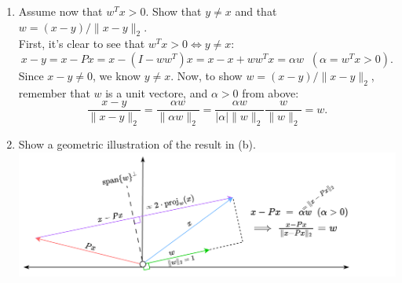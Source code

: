 \documentclass[11pt]{article}
\newcommand{\n}{\vspace{0.3cm}}
\begin{document}
\begin{enumerate}
\begin{enumerate}
		      \item Assume now that \(w^T x > 0\).  Show that \(y \neq x\) and that \(w = (x-y)/\lVert x-y \rVert_2\). \n\\
		            First, it's clear to see that \(w^T x > 0 \iff y \neq x\):
		            \[x - y = x - Px = x - (I - ww^T)x = x - x + ww^T x = \alpha w \;\; (\alpha = w^T x > 0).\]
		            Since \(x - y \neq 0\), we know \(y \neq x\).  Now, to show \(w = (x-y)/\lVert x-y \rVert_2\), remember that \(w\) is a unit vectore, and \(\alpha > 0\) from above:
		            \[\frac{x-y}{\lVert x-y \rVert_2} = \frac{\alpha w}{\lVert \alpha w \rVert_2} = \frac{\alpha w}{|\alpha| \lVert w \rVert_2} \frac{w}{\lVert w \rVert_2} = w.\]

		      \item Show a geometric illustration of the result in (b). \\
		            \includegraphics[width=\textwidth]{householder.png}
	      \end{enumerate}


\end{enumerate}
\end{document}
